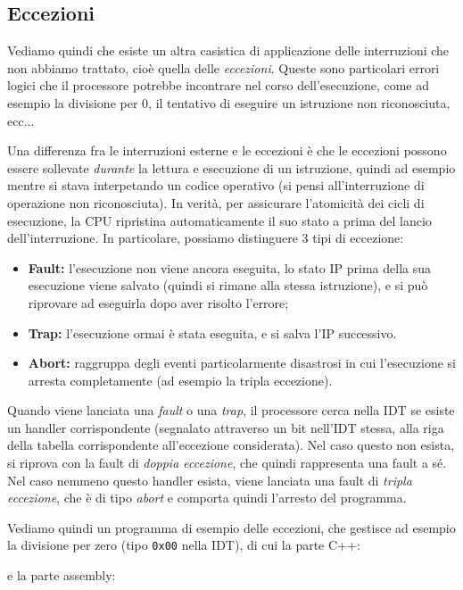 \documentclass[a4paper,11pt]{article}
\begin{document}
\subsection{Eccezioni}
Vediamo quindi che esiste un altra casistica di applicazione delle interruzioni che non abbiamo trattato, cioè quella delle \textit{eccezioni}.
Queste sono particolari errori logici che il processore potrebbe incontrare nel corso dell'esecuzione, come ad esempio la divisione per 0, il tentativo di eseguire un istruzione non riconosciuta, ecc...

Una differenza fra le interruzioni esterne e le eccezioni è che le eccezioni possono essere sollevate \textit{durante} la lettura e esecuzione di un istruzione, quindi ad esempio mentre si stava interpetando un codice operativo (si pensi all'interruzione di operazione non riconosciuta).
In verità, per assicurare l'atomicità dei cicli di esecuzione, la CPU ripristina automaticamente il suo stato a prima del lancio dell'interruzione.
In particolare, possiamo distinguere 3 tipi di eccezione:
\begin{itemize}
	\item \textbf{Fault:} l'esecuzione non viene ancora eseguita, lo stato IP prima della sua esecuzione viene salvato (quindi si rimane alla stessa istruzione), e si può riprovare ad eseguirla dopo aver risolto l'errore;
	\item \textbf{Trap:} l'esecuzione ormai è stata eseguita, e si salva l'IP successivo.
	\item \textbf{Abort:} raggruppa degli eventi particolarmente disastrosi in cui l'esecuzione si arresta completamente (ad esempio la tripla eccezione).
\end{itemize}

Quando viene lanciata una \textit{fault} o una \textit{trap}, il processore cerca nella IDT se esiste un handler corrispondente (segnalato attraverso un bit nell'IDT stessa, alla riga della tabella corrispondente all'eccezione considerata).
Nel caso questo non esista, si riprova con la fault di \textit{doppia eccezione}, che quindi rappresenta una fault a sé.
Nel caso nemmeno questo handler esista, viene lanciata una fault di \textit{tripla eccezione}, che è di tipo \textit{abort} e comporta quindi l'arresto del programma.

\par\medskip

Vediamo quindi un programma di esempio delle eccezioni, che gestisce ad esempio la divisione per zero (tipo \lstinline|0x00| nella IDT), di cui la parte C++:
\lstset{style=codestyle, language=C++}

e la parte assembly:
\lstset{style=codestyle, language=assembler}

\end{document}

